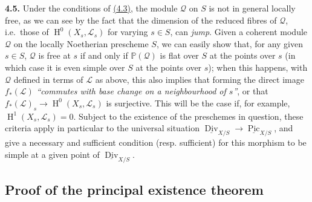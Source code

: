 \documentclass{article}
\newenvironment{rmenv}[1]
  {\phantomsection\par\smallskip\noindent\textbf{#1.}\rmfamily}
  {\par\smallskip}
\newcommand{\oldpage}[1]{\marginpar{\footnotesize$\Big\vert$ \textit{p.~#1}}}
\theoremstyle{definition}
\theoremstyle{definition}
\theoremstyle{definition}
\theoremstyle{definition}
\theoremstyle{remark}
\begin{document}
\leavevmode{}%
\begin{rmenv}{4.5}
Under the conditions of \protect\hyperlink{fga-3-v-theorem-4.3}{(4.3)}, the module \({\mathscr{Q}}\) on \(S\) is not in general locally free, as we can see by the fact that the dimension of the reduced fibres of \({\mathscr{Q}}\), i.e.~those of \(\operatorname{H}^0(X_s,{\mathscr{L}}_s)\) for varying \(s\in S\), can \emph{jump}.
Given a coherent module \({\mathscr{Q}}\) on the locally Noetherian prescheme \(S\), we can easily show that, for any given \(s\in S\), \({\mathscr{Q}}\) is free at \(s\) if and only if \(\mathbb{P}({\mathscr{Q}})\) is flat over \(S\) at the points over \(s\) (in which case it is even simple over \(S\) at the points over \(s\));
when this happens, with \({\mathscr{Q}}\) defined in terms of \({\mathscr{L}}\) as above, this also implies that forming the direct image \(f_*({\mathscr{L}})\) \emph{``commutes with base change on a neighbourhood of \(s\)''}, or that \(f_*({\mathscr{L}})_s\to\operatorname{H}^0(X_s,{\mathscr{L}}_s)\) is surjective.
\oldpage{232-12}This will be the case if, for example, \(\operatorname{H}^1(X_s,{\mathscr{L}}_s)=0\).
Subject to the existence of the preschemes in question, these criteria apply in particular to the universal situation \(\underline{\operatorname{Div}}_{X/S}\to\underline{\operatorname{Pic}}_{X/S}\), and give a necessary and sufficient condition (resp. sufficient) for this morphism to be simple at a given point of \(\underline{\operatorname{Div}}_{X/S}\).

\end{rmenv}

\hypertarget{fga-3-v-section-5}{%
\subsection{Proof of the principal existence theorem}\label{fga-3-v-section-5}}
\end{document}
